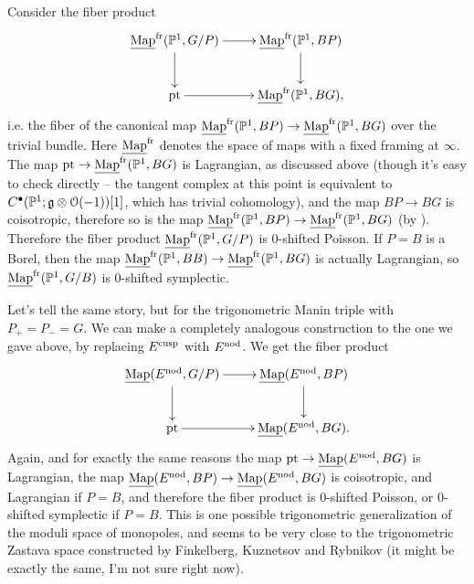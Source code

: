 \documentclass[10pt, oneside, a4paper]{article}
\newcommand{\map}{\ul{\mr{Map}}}
\newcommand{\mapf}{\ul{\mr{Map}}^{\mr{fr}}}
\begin{document}
\begin{example}
Consider the fiber product
\[\xymatrix{
 \mapf(\bb P^1, G/P) \ar[r]\ar[d] &\mapf(\bb P^1, BP) \ar[d] \\
 \pt \ar[r] &\mapf(\bb P^1, BG),}
\]
i.e. the fiber of the canonical map $\mapf(\bb P^1, BP) \to \mapf(\bb P^1, BG)$ over the trivial bundle.  Here $\mapf$ denotes the space of maps with a fixed framing at $\infty$.  The map $\pt \to \mapf(\bb P^1, BG)$ is Lagrangian, as discussed above (though it's easy to check directly -- the tangent complex at this point is equivalent to $C^\bullet(\mathbb{P}^1; \mathfrak{g} \otimes \mathcal{O}(-1))[1]$, which has trivial cohomology), and the map $BP \to BG$ is coisotropic, therefore so is the map $\mapf(\bb P^1, BP) \to \mapf(\bb P^1, BG)$ (by \cite[Theorem 3.5]{Spaide}).  Therefore the fiber product $\mapf(\bb P^1, G/P)$ is 0-shifted Poisson.  If $P = B$ is a Borel, then the map $\mapf(\bb P^1, BB) \to \mapf(\bb P^1, BG)$ is actually Lagrangian, so $\mapf(\bb P^1, G/B)$ is 0-shifted symplectic.
\end{example}

\begin{example} \label{nodal_curve_example}
Let's tell the same story, but for the trigonometric Manin triple with $P_+ = P_- = G$.  We can make a completely analogous construction to the one we gave above, by replacing $E^{\mathrm{cusp}}$ with $E^{\mathrm{nod}}$.  We get the fiber product
\[\xymatrix{
 \map(E^{\mr{nod}}, G/P) \ar[r]\ar[d] &\map(E^{\mr{nod}}, BP) \ar[d] \\
 \pt \ar[r] &\map(E^{\mr{nod}}, BG).}
\]
Again, and for exactly the same reasons the map $\pt \to \map(E^{\mr{nod}}, BG)$ is Lagrangian, the map $\map(E^{\mr{nod}}, BP) \to \map(E^{\mr{nod}}, BG)$ is coisotropic, and Lagrangian if $P= B$, and therefore the fiber product is 0-shifted Poisson, or 0-shifted symplectic if $P= B$.  This is one possible trigonometric generalization of the moduli space of monopoles, and seems to be very close to the trigonometric Zastava space constructed by Finkelberg, Kuznetsov and Rybnikov \cite{FKR} (it might be exactly the same, I'm not sure right now).
\end{example}
\end{document}
